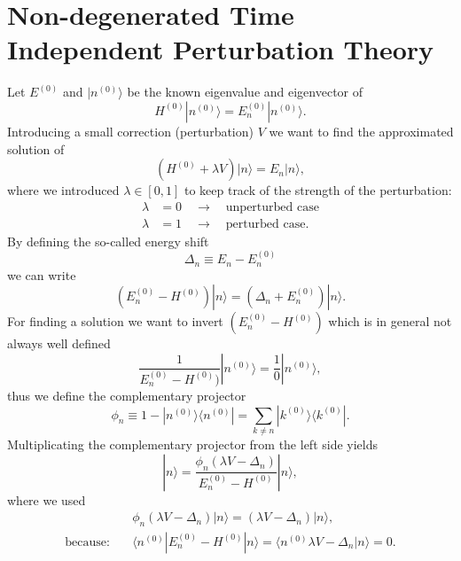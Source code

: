 
\section{Non-degenerated Time Independent Perturbation Theory}
Let $E^{(0)}$ and $| n^{(0)} \rangle$ be the known eigenvalue and eigenvector of
\begin{equation}
	H^{(0)} | n^{(0)} \rangle = E_n^{(0)} | n^{(0)} \rangle.
\end{equation}
Introducing a small correction (perturbation) $V$ we want to find the approximated solution of 
\begin{equation}
	\label{perturbedSchroedinger}
	(H^{(0)} +  \lambda V)| n \rangle = E_n | n \rangle,
\end{equation}
where we introduced $\lambda \in [0, 1]$ to keep track of the strength of the perturbation:
\begin{align}
	\lambda &= 0 \quad \to \quad \text{unperturbed case} \\
	\lambda &= 1 \quad \to \quad \text{perturbed case}.
\end{align}
By defining the so-called energy shift
\begin{equation}
	\Delta_n \equiv E_n - E_n^{(0)}
\end{equation}
we can write
\begin{equation}
	(E_n^{(0)} - H^{(0)}) | n \rangle = ( \Delta_n + E_n^{(0)}) | n \rangle.
\end{equation}
For finding a solution we want to invert $(E_n^{(0)} - H^{(0)})$ which is in general not always well defined
\begin{equation} 
	\frac{1}{E_n^{(0)} - H^{(0)})} | n^{(0)} \rangle = \frac{1}{0} | n^{(0)} \rangle, 
\end{equation}
thus we define the complementary projector
\begin{equation}
	\phi_n \equiv 1 - | n^{(0)} \rangle \langle n^{(0)} | =  \sum_{k \neq n} | k^{(0)} \rangle \langle k^{(0)} |.
\end{equation}
Multiplicating the complementary projector from the left side yields
\begin{equation}
	| n \rangle = \frac{\phi_n (\lambda V - \Delta_n ) }{E_n^{(0)} - H^{(0)}} | n\rangle, 
\end{equation}
where we used 
\begin{align}
	&\phi_n (\lambda V - \Delta_n ) | n \rangle = (\lambda V - \Delta_n) | n \rangle, \\
	\text{because:} \quad &\langle n^{(0)} | E_n^{(0)} - H^{(0)} | n \rangle = \langle n^{(0)} \lambda V - \Delta_n | n \rangle = 0.
\end{align}
